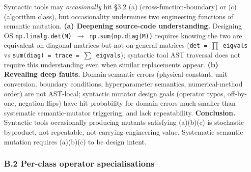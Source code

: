 \documentclass[review,12pt,authoryear]{elsarticle}
\begin{document}
Syntactic tools may \emph{occasionally} hit §3.2 (a)
(cross-function-boundary) or (c) (algorithm class), but occasionality
undermines two engineering functions of semantic mutation. \textbf{(a)
Deepening source-code understanding.} Designing OS
\texttt{np.linalg.det(M)\ $\to$\ np.sum(np.diag(M))} requires knowing the
two are equivalent on diagonal matrices but not on general matrices
(\texttt{det\ =\ $\prod$\ eigvals} vs
\texttt{sum(diag)\ =\ trace\ =\ $\sum$\ eigvals}); syntactic tool AST
traversal does not require this understanding even when similar
replacements appear. \textbf{(b) Revealing deep faults.}
Domain-semantic errors (physical-constant, unit conversion, boundary
conditions, hyperparameter semantics, numerical-method order) are not
AST-local; syntactic mutator design goals (operator typos, off-by-one,
negation flips) have hit probability for domain errors much smaller than
systematic semantic-mutator triggering, and lack repeatability.
\textbf{Conclusion.} Syntactic tools occasionally producing mutants
satisfying (a)(b)(c) is stochastic byproduct, not repeatable, not
carrying engineering value. Systematic semantic mutation requires
(a)(b)(c) to be design intent.

\subsubsection{B.2 Per-class operator specialisations}\label{b.2-per-class-operator-specialisations}
\end{document}

